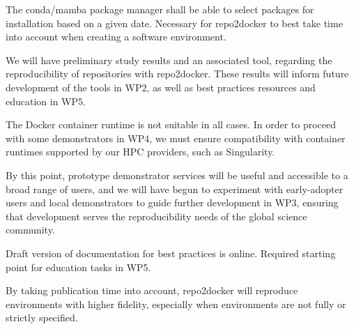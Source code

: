 \begin{milestones}
  {
  The conda/mamba package manager shall be able to
  select packages for installation based on a given date.
  Necessary for repo2docker to best take time into account
  when creating a software environment.
  }

  {
  We will have preliminary study results and an associated tool,
  regarding the reproducibility of repositories with repo2docker.
  These results will inform future development of the tools in WP2,
  as well as best practices resources and education in WP5.
  }

  {
  The Docker container runtime is not suitable in all cases.
  In order to proceed with some demonstrators in WP4,
  we must ensure compatibility with container runtimes supported by our HPC providers,
  such as Singularity.
  }

  {
  By this point, prototype demonstrator services will be useful and accessible
  to a broad range of users, and we will have begun to experiment with early-adopter
  users and local demonstrators to guide further development in WP3,
  ensuring that development serves the reproducibility needs of the global science community.
  }

  {
  Draft version of documentation for best practices is online.
  Required starting point for education tasks in WP5.
  }

  {
  By taking publication time into account,
  repo2docker will reproduce environments with higher fidelity,
  especially when environments are not fully or strictly specified.
  }


\end{milestones}
